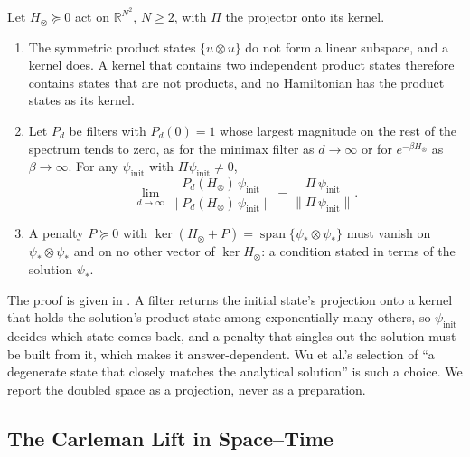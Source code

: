 \begin{proposition}
\label{prop:no-penalty}
Let $H_\otimes\succeq0$ act on $\mathbb{R}^{N^2}$, $N\ge2$, with $\Pi$ the projector onto its kernel.
\begin{enumerate}
    \item The symmetric product states $\{u\otimes u\}$ do not form a linear subspace, and a kernel does. A kernel that contains two independent product states therefore contains states that are not products, and no Hamiltonian has the product states as its kernel.
    \item Let $P_d$ be filters with $P_d(0)=1$ whose largest magnitude on the rest of the spectrum tends to zero, as for the minimax filter as $d\to\infty$ or for $e^{-\beta H_\otimes}$ as $\beta\to\infty$. For any $\psi_{\mathrm{init}}$ with $\Pi\psi_{\mathrm{init}}\ne0$,
    \begin{equation}
        \lim_{d\to\infty}\frac{P_d(H_\otimes)\,\psi_{\mathrm{init}}}{\bigl\|P_d(H_\otimes)\,\psi_{\mathrm{init}}\bigr\|}
        =\frac{\Pi\,\psi_{\mathrm{init}}}{\bigl\|\Pi\,\psi_{\mathrm{init}}\bigr\|}.
        \label{eq:doubled-projection}
    \end{equation}
    \item A penalty $P\succeq0$ with $\ker(H_\otimes+P)=\operatorname{span}\{\psi_*\otimes\psi_*\}$ must vanish on $\psi_*\otimes\psi_*$ and on no other vector of $\ker H_\otimes$: a condition stated in terms of the solution $\psi_*$.
\end{enumerate}
\end{proposition}
The proof is given in . A filter returns the initial state's projection onto a kernel that holds the solution's product state among exponentially many others, so $\psi_{\mathrm{init}}$ decides which state comes back, and a penalty that singles out the solution must be built from it, which makes it answer-dependent. Wu et al.'s selection of ``a degenerate state that closely matches the analytical solution'' is such a choice. We report the doubled space as a projection, never as a preparation.

\subsection{The Carleman Lift in Space--Time}
\label{sec:carleman}

